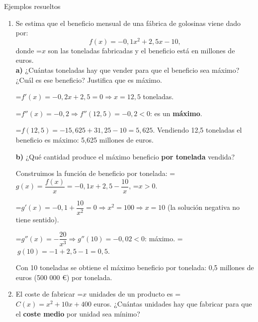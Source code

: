 \documentclass[11pt,a4paper]{article}
\newcommand{\lt}{<}\newcommand{\gt}{>}
\newcommand{\fmm}[1]{\setbox0=\hbox{$#1$}\ifdim\wd0>\linewidth\[#1\]\else\mbox{\box0}\fi}
\begin{document}
  
\begin{fmex}{Ejemplos resueltos}
\begin{enumerate}[label=\textbf{\arabic*.},leftmargin=*]
\item Se estima que el beneficio mensual de una fábrica de golosinas viene dado por: \[f(x)=-0{,}1x^2+2{,}5x-10,\]donde \fmm{x} son las toneladas fabricadas y el beneficio está en millones de euros. \\ 
\textbf{a)} ¿Cuántas toneladas hay que vender para que el beneficio sea máximo? ¿Cuál es ese beneficio? Justifica que es máximo.
          

            

\fmm{f'(x)=-0{,}2x+2{,}5=0\Rightarrow x=12{,}5} toneladas.

            

\fmm{f''(x)=-0{,}2\Rightarrow f''(12{,}5)=-0{,}2\lt0}: es un \textbf{máximo}.

            

\fmm{f(12{,}5)=-15{,}625+31{,}25-10=5{,}625}. Vendiendo 12,5 toneladas el beneficio es máximo: 5,625 millones de euros.

          

          

\textbf{b)} ¿Qué cantidad produce el máximo beneficio \textbf{por tonelada} vendida?

          

            

Construimos la función de beneficio por tonelada: \fmm{g(x)=\dfrac{f(x)}{x}=-0{,}1x+2{,}5-\dfrac{10}{x}}, \fmm{x\gt0}.

            

\fmm{g'(x)=-0{,}1+\dfrac{10}{x^2}=0\Rightarrow x^2=100\Rightarrow x=10} (la solución negativa no tiene sentido).

            

\fmm{g''(x)=-\dfrac{20}{x^3}\Rightarrow g''(10)=-0{,}02\lt0}: máximo. \fmm{\ g(10)=-1+2{,}5-1=0{,}5}.

            

Con 10 toneladas se obtiene el máximo beneficio por tonelada: 0,5 millones de euros (500 000 €) por tonelada.
\item El coste de fabricar \fmm{x} unidades de un producto es \fmm{C(x)=x^2+10x+400} euros. ¿Cuántas unidades hay que fabricar para que el \textbf{coste medio} por unidad sea mínimo?
          

            


\end{enumerate}
\end{fmex}
\end{document}
